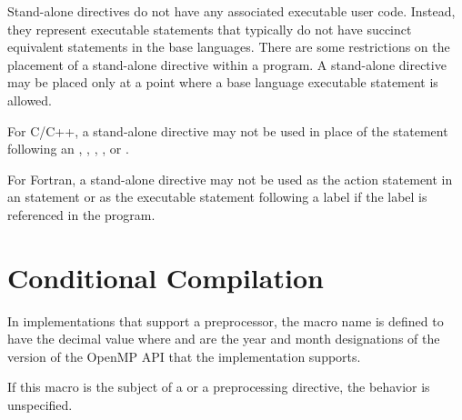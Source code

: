 \descr
Stand-alone directives do not have any associated executable user code. Instead, they
represent executable statements that typically do not have succinct equivalent statements
in the base languages. There are some restrictions on the placement of a stand-alone
directive within a program. A stand-alone directive may be placed only at a point where
a base language executable statement is allowed.

\restrictions
\begin{ccppspecific}
For C/C++, a stand-alone directive may not be used in place of the statement following
an , , , , or .
\end{ccppspecific}

\begin{fortranspecific}
For Fortran, a stand-alone directive may not be used as the action statement in an 
statement or as the executable statement following a label if the label is referenced in
the program.
\end{fortranspecific}









\section{Conditional Compilation}
\label{sec:Conditional Compilation}
In implementations that support a preprocessor, the  macro name is defined to
have the decimal value  where  and  are the year and month designations
of the version of the OpenMP API that the implementation supports.

If this macro is the subject of a  or a  preprocessing directive, the
behavior is unspecified.


